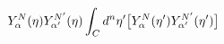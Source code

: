 \begin{equation}
Y_{\alpha}^N({\eta})Y_{\alpha'}^{N'}({\eta})\int_Cd^n\eta'\big{[}Y_{\alpha}^N(\eta')
Y_{\alpha'}^{N'}({\eta}')\big{]}
\end{equation}

